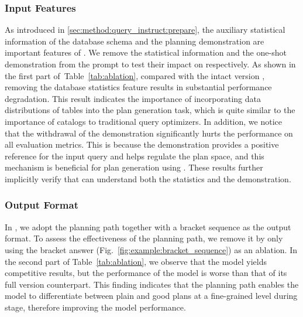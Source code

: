\subsubsection{Input Features}
As introduced in \cref{sec:method:query_instruct:prepare}, 
the auxiliary statistical information of the database schema and the planning demonstration are important features of \QueryInstruct.  
We remove the statistical information and the one-shot demonstration from the prompt to test their impact on \QueryInstruct respectively. 
As shown in the first part of~Table~\ref{tab:ablation}, compared with the intact version \LLMQO, removing the database statistics feature results in substantial performance degradation.
This result indicates the importance of incorporating data distributions of tables into the plan generation task, which is quite similar to the importance of catalogs to traditional query optimizers. 
In addition, we notice that the withdrawal of the demonstration significantly hurts the performance
on all evaluation metrics. 
This is because the demonstration provides a positive reference for the input query and helps regulate the plan space, and this mechanism is beneficial for plan generation using \LLMQO.
These results further implicitly verify that \LLMQO can understand both the statistics and the demonstration. 

\subsubsection{Output Format}
In \QueryInstruct, we adopt the planning path together with a bracket sequence  as the output format. 
To assess the effectiveness of the planning path, we remove it by only using the bracket answer (Fig.~\ref{fig:example:bracket_sequence})  as an ablation. In the second part of Table~\ref{tab:ablation}, we observe that
the \QIT model yields competitive results, but the performance of the \QDPO model is worse than that of its full version counterpart. 
This finding indicates that the planning path enables the model to differentiate between plain and good plans at a fine-grained level during \QDPO stage, therefore improving the model performance.

